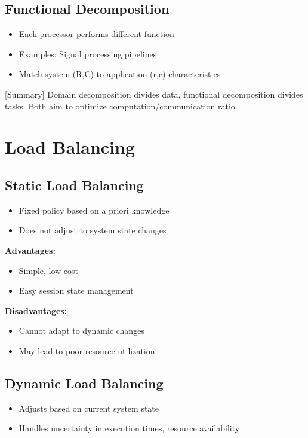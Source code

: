 \documentclass[12pt]{article}
\begin{document}
\subsection{Functional Decomposition}

\begin{itemize}
    \item Each processor performs different function
    \item Examples: Signal processing pipelines
    \item Match system (R,C) to application (r,c) characteristics
\end{itemize}

[Summary] Domain decomposition divides data, functional decomposition divides tasks. Both aim to optimize computation/communication ratio.

\section{Load Balancing}

\subsection{Static Load Balancing}

\begin{itemize}
    \item Fixed policy based on a priori knowledge
    \item Does not adjust to system state changes
\end{itemize}

\textbf{Advantages:}
\begin{itemize}
    \item Simple, low cost
    \item Easy session state management
\end{itemize}

\textbf{Disadvantages:}
\begin{itemize}
    \item Cannot adapt to dynamic changes
    \item May lead to poor resource utilization
\end{itemize}

\subsection{Dynamic Load Balancing}

\begin{itemize}
    \item Adjusts based on current system state
    \item Handles uncertainty in execution times, resource availability
\end{itemize}
\end{document}
